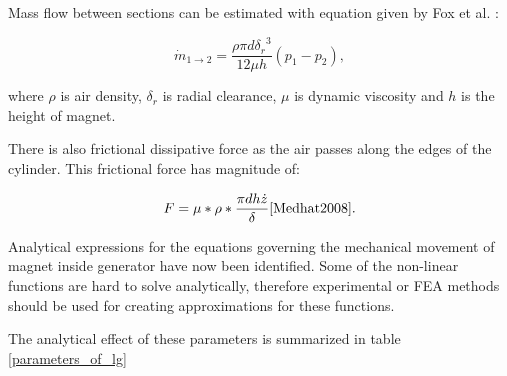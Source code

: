Mass flow between sections can be estimated with equation given by Fox et al. \cite{Fox2008}:

\begin{equation}
  \dot{m}_{1 \rightarrow 2} = \frac{\rho \pi d {\delta_r}^3}{12\mu h}(p_1-p_2),
\end{equation}

where $\rho$ is air density, $\delta_r$ is radial clearance, $\mu$ is dynamic viscosity and $h$ is the height of magnet. \cite{Tornincasa2012}

There is also frictional dissipative force as the air passes along the edges of the cylinder. This frictional force has magnitude of: 

\begin{equation}
  F = \mu * \rho * \frac{\pi d h \dot{z}}{\delta} \cite{Medhat2008}. 
\end{equation}

Analytical expressions for the equations governing the mechanical movement of magnet inside generator have now been identified. Some of the non-linear functions are hard to solve analytically, therefore experimental or FEA methods should be used for creating approximations for these functions.

The analytical effect of these parameters is summarized in table \ref{parameters_of_lg}

\begin{table}[htb]
\caption{\label{parameters_of_lg} Effect of parameters of generator}
\begin{center}
\end{center}
\end{table}


